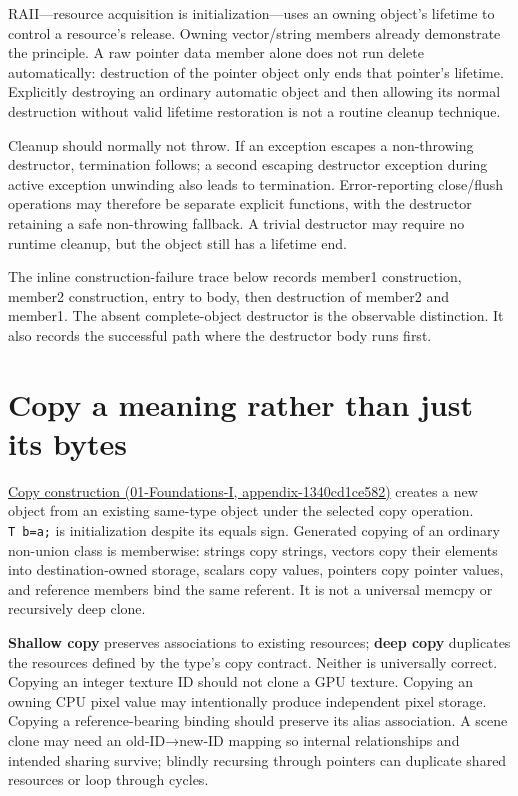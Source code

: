RAII---resource acquisition is initialization---uses an owning object's lifetime to control a resource's release. Owning vector/string members already demonstrate the principle. A raw pointer data member alone does not run delete automatically: destruction of the pointer object only ends that pointer's lifetime. Explicitly destroying an ordinary automatic object and then allowing its normal destruction without valid lifetime restoration is not a routine cleanup technique.

Cleanup should normally not throw. If an exception escapes a non-throwing destructor, termination follows; a second escaping destructor exception during active exception unwinding also leads to termination. Error-reporting close/flush operations may therefore be separate explicit functions, with the destructor retaining a safe non-throwing fallback. A trivial destructor may require no runtime cleanup, but the object still has a lifetime end.

The inline construction-failure trace below records member1 construction, member2 construction, entry to body, then destruction of member2 and member1. The absent complete-object destructor is the observable distinction. It also records the successful path where the destructor body runs first.

\section{Copy a meaning rather than just its bytes}\label{05-engine-i-ch003-copy-a-meaning-rather-than-just-its-bytes}

\href{../01-Foundations-I/main.pdf\#nameddest=appendix-1340cd1ce582}{Copy construction (01-Foundations-I, appendix-1340cd1ce582)} creates a new object from an existing same-type object under the selected copy operation. \texttt{T\ b=a;} is initialization despite its equals sign. Generated copying of an ordinary non-union class is memberwise: strings copy strings, vectors copy their elements into destination-owned storage, scalars copy values, pointers copy pointer values, and reference members bind the same referent. It is not a universal memcpy or recursively deep clone.

\textbf{Shallow copy} preserves associations to existing resources; \textbf{deep copy} duplicates the resources defined by the type's copy contract. Neither is universally correct. Copying an integer texture ID should not clone a GPU texture. Copying an owning CPU pixel value may intentionally produce independent pixel storage. Copying a reference-bearing binding should preserve its alias association. A scene clone may need an old-ID→new-ID mapping so internal relationships and intended sharing survive; blindly recursing through pointers can duplicate shared resources or loop through cycles.

